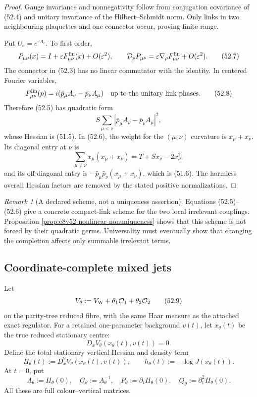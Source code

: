 \documentclass[11pt,oneside]{book}
\theoremstyle{definition}
\theoremstyle{remark}
\newtheorem{remark}[theorem]{Remark}
\begin{document}
\begin{proof}
Gauge invariance and nonnegativity follow from conjugation
covariance of (52.4) and unitary invariance of the Hilbert--Schmidt
norm.  Only links in two neighbouring plaquettes and one connector
occur, proving finite range.

Put \(U_e=e^{\varepsilon A_e}\).  To first order,
\[
 P_{\mu\nu}(x)=I+\varepsilon
 F_{\mu\nu}^{\rm lin}(x)+O(\varepsilon^2),\qquad
 {\cal D}_\rho P_{\mu\nu}
 =\varepsilon\nabla_\rho F_{\mu\nu}^{\rm lin}
 +O(\varepsilon^2).                                          \tag{52.7}
\]
The connector in (52.3) has no linear commutator with the identity.
In centered Fourier variables,
\[
 F_{\mu\nu}^{\rm lin}(p)
 =i(\bar p_\mu A_\nu-\bar p_\nu A_\mu)
 \quad\hbox{up to the unitary link phases}.                   \tag{52.8}
\]
Therefore (52.5) has quadratic form
\[
 S\sum_{\mu<\nu}
 |\bar p_\mu A_\nu-\bar p_\nu A_\mu|^2,
\]
whose Hessian is (51.5).  In (52.6), the weight for the
\((\mu,\nu)\) curvature is \(x_\mu+x_\nu\).  Its diagonal entry at
\(\nu\) is
\[
 \sum_{\mu\ne\nu}x_\mu(x_\mu+x_\nu)
 =T+Sx_\nu-2x_\nu^2,
\]
and its off-diagonal entry is
\(-\bar p_\mu\bar p_\nu(x_\mu+x_\nu)\), which is (51.6).
The harmless overall Hessian factors are removed by the stated
positive normalizations.
\end{proof}

\begin{remark}[A declared scheme, not a uniqueness assertion]
\label{rem:e8v52-completion-scheme}
Equations (52.5)--(52.6) give a concrete compact-link scheme for
the two local irrelevant couplings.  Proposition
\ref{prop:e8v52-nonlinear-nonuniqueness} shows that this scheme is
not forced by their quadratic germs.  Universality must eventually
show that changing the completion affects only summable irrelevant
terms.
\end{remark}

\subsection{Coordinate-complete mixed jets}

Let
\[
 V_\theta:=V_{\rm W}+\theta_1{\cal O}_1+\theta_2{\cal O}_2     \tag{52.9}
\]
on the parity-tree reduced fibre, with the same Haar measure as the
attached exact regulator.  For a retained one-parameter background
\(v(t)\), let \(x_\theta(t)\) be the true reduced stationary centre:
\[
 D_xV_\theta(x_\theta(t),v(t))=0.                             \tag{52.10}
\]
Define the total stationary vertical Hessian and density term
\[
 H_\theta(t)
 :=D_x^2V_\theta(x_\theta(t),v(t)),\qquad
 h_\theta(t):=-\log J(x_\theta(t)).                           \tag{52.11}
\]
At \(t=0\), put
\[
 A_\theta:=H_\theta(0),\quad G_\theta:=A_\theta^{-1},\quad
 P_\theta:=\partial_tH_\theta(0),\quad
 Q_\theta:=\partial_t^2H_\theta(0).                           \tag{52.12}
\]
All these are full colour--vertical matrices.
\end{document}
